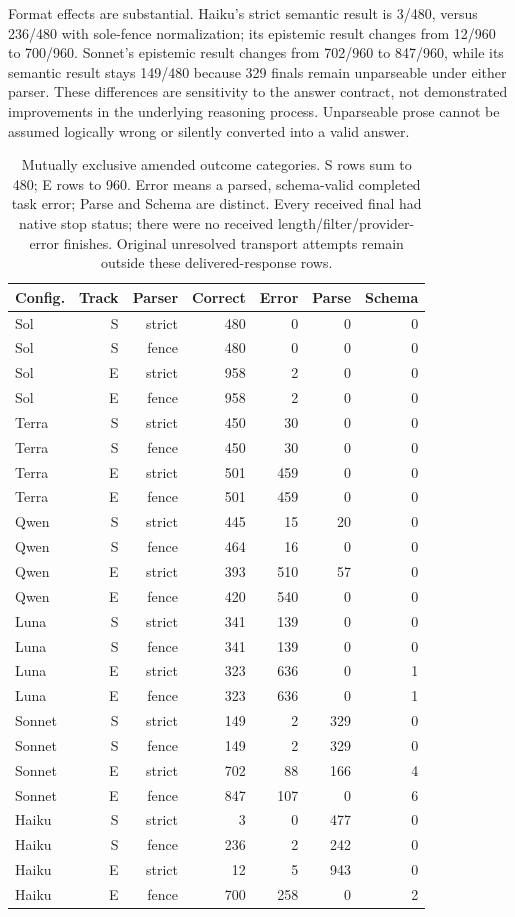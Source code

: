 \documentclass[a4paper,preprint,12pt,numbers,nopreprintline]{elsarticle}
\begin{document}
Format effects are substantial. Haiku's strict semantic result is 3/480, versus 236/480 with sole-fence normalization; its epistemic result changes from 12/960 to 700/960. Sonnet's epistemic result changes from 702/960 to 847/960, while its semantic result stays 149/480 because 329 finals remain unparseable under either parser. These differences are sensitivity to the answer contract, not demonstrated improvements in the underlying reasoning process. Unparseable prose cannot be assumed logically wrong or silently converted into a valid answer.
\begin{table}[htbp]\centering\scriptsize
\caption{Mutually exclusive amended outcome categories. S rows sum to 480; E rows to 960. Error means a parsed, schema-valid completed task error; Parse and Schema are distinct. Every received final had native stop status; there were no received length/filter/provider-error finishes. Original unresolved transport attempts remain outside these delivered-response rows.}\label{tab:native-outcomes}
\setlength{\tabcolsep}{3pt}
\begin{tabular}{lrrrrrr}\toprule
Config. & Track & Parser & Correct & Error & Parse & Schema\\\midrule
Sol & S & strict & 480 & 0 & 0 & 0\\
Sol & S & fence & 480 & 0 & 0 & 0\\
Sol & E & strict & 958 & 2 & 0 & 0\\
Sol & E & fence & 958 & 2 & 0 & 0\\
Terra & S & strict & 450 & 30 & 0 & 0\\
Terra & S & fence & 450 & 30 & 0 & 0\\
Terra & E & strict & 501 & 459 & 0 & 0\\
Terra & E & fence & 501 & 459 & 0 & 0\\
Qwen & S & strict & 445 & 15 & 20 & 0\\
Qwen & S & fence & 464 & 16 & 0 & 0\\
Qwen & E & strict & 393 & 510 & 57 & 0\\
Qwen & E & fence & 420 & 540 & 0 & 0\\
Luna & S & strict & 341 & 139 & 0 & 0\\
Luna & S & fence & 341 & 139 & 0 & 0\\
Luna & E & strict & 323 & 636 & 0 & 1\\
Luna & E & fence & 323 & 636 & 0 & 1\\
Sonnet & S & strict & 149 & 2 & 329 & 0\\
Sonnet & S & fence & 149 & 2 & 329 & 0\\
Sonnet & E & strict & 702 & 88 & 166 & 4\\
Sonnet & E & fence & 847 & 107 & 0 & 6\\
Haiku & S & strict & 3 & 0 & 477 & 0\\
Haiku & S & fence & 236 & 2 & 242 & 0\\
Haiku & E & strict & 12 & 5 & 943 & 0\\
Haiku & E & fence & 700 & 258 & 0 & 2\\
\bottomrule\end{tabular}
\end{table}
\end{document}
